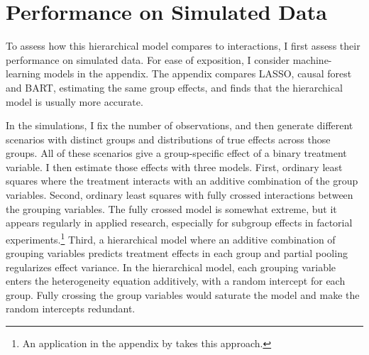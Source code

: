 \documentclass[12pt]{article}
\begin{document}
%
%
%
%
%






\section{Performance on Simulated Data}

To assess how this hierarchical model compares to interactions, I first assess their performance on simulated data.
For ease of exposition, I consider machine-learning models in the appendix. 
The appendix compares LASSO, causal forest and BART, estimating the same group effects, and finds that the hierarchical model is usually more accurate. 


In the simulations, I fix the number of observations, and then generate different scenarios with distinct groups and distributions of true effects across those groups. 
All of these scenarios give a group-specific effect of a binary treatment variable.
I then estimate those effects with three models.
First, ordinary least squares where the treatment interacts with an additive combination of the group variables. 
Second, ordinary least squares with fully crossed interactions between the grouping variables.
The fully crossed model is somewhat extreme, but it appears regularly in applied research, especially for subgroup effects in factorial experiments.\footnote{An application in the appendix by \citet{TomzWeeks2021} takes this approach.}
Third, a hierarchical model where an additive combination of grouping variables predicts treatment effects in each group and partial pooling regularizes effect variance.
In the hierarchical model, each grouping variable enters the heterogeneity equation additively, with a random intercept for each group.
Fully crossing the group variables would saturate the model and make the random intercepts redundant.
\end{document}
